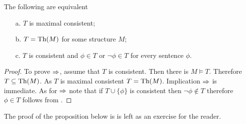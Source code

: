 \documentclass[creche.tex]{subfiles}
\begin{document}
\begin{proposition}\label{fattoconsistenzasen4sostretto}
The following are equivalent
\begin{itemize}
\item[a.] $T$ is maximal consistent;
\item[b.] $T=\textrm{Th}(M)$ for some structure $M$;
\item[c.] $T$ is consistent and $\phi\in T$ or $\neg\phi\in T$ for every sentence $\phi$.
\end{itemize}
\end{proposition}
\begin{proof}
To prove $\Rightarrow$, assume that $T$ is consistent.
Then there is $M\models T$.
Therefore $T\subseteq\textrm{Th} (M)$.
As $T$ is maximal consistent $T=\textrm{Th}(M)$.
Implication $\Rightarrow$ is immediate.
 As for $\Rightarrow$ note that if $T\cup\{\phi\}$ is consistent then $\neg\phi\not\in T$ therefore $\phi\in T$ follows from .
\end{proof}

The proof of the proposition below is is left as an exercise for the reader.
\end{document}
